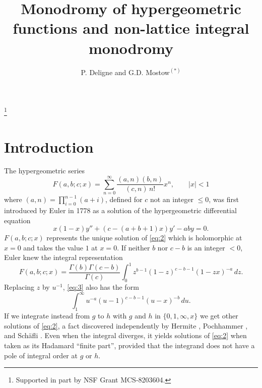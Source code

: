 \documentclass[12pt,a4paper]{article}
\theoremstyle{plain}
\theoremstyle{definition}
\theoremstyle{remark}
\numberwithin{equation}{section}
\begin{document}
\title{Monodromy of hypergeometric functions and non-lattice integral monodromy}
\author{P. Deligne and G.D. Mostow${}^{(*)}$}
\thanks{Supported in part by NSF Grant MCS-8203604.}
\date{}
\maketitle

\section*{Introduction}

The hypergeometric series
\begin{equation}\label{eq:1}
F(a,b;c;x) = \sum_{n=0}^{\infty} \frac{(a,n)(b,n)}{(c,n)\, n!} x^n, \qquad |x| < 1
\end{equation}
where $(a,n) = \prod_{i=0}^{n-1} (a+i)$, defined for $c$ not an integer $\leq 0$, was first introduced by Euler in 1778 as a solution of the hypergeometric differential equation
\begin{equation}\label{eq:2}
x(1-x)y'' + (c - (a+b+1)x) y' - aby = 0.
\end{equation}
$F(a,b;c;x)$ represents the unique solution of \eqref{eq:2} which is holomorphic at $x=0$ and takes the value $1$ at $x=0$. If neither $b$ nor $c-b$ is an integer $< 0$, Euler knew the integral representation
\begin{equation}\label{eq:3}
F(a,b;c;x) = \frac{\Gamma(b)\Gamma(c-b)}{\Gamma(c)} \int_0^1 z^{b-1} (1-z)^{c-b-1} (1-zx)^{-a} \, dz.
\end{equation}
Replacing $z$ by $u^{-1}$, \eqref{eq:3} also has the form
\begin{equation*}\tag{$3'$}
\int_1^{\infty} u^{-a} (u-1)^{c-b-1} (u-x)^{-b} \, du.
\end{equation*}
If we integrate instead from $g$ to $h$ with $g$ and $h$ in $\{0, 1, \infty, x\}$ we get other solutions of \eqref{eq:2}, a fact discovered independently by Hermite \cite{Hermite}, Pochhammer \cite{Pochhammer}, and Sch\"afli \cite{Schaefli}. Even when the integral diverges, it yields solutions of \eqref{eq:2} when taken as its Hadamard ``finite part'', provided that the integrand does not have a pole of integral order at $g$ or $h$.
\end{document}
